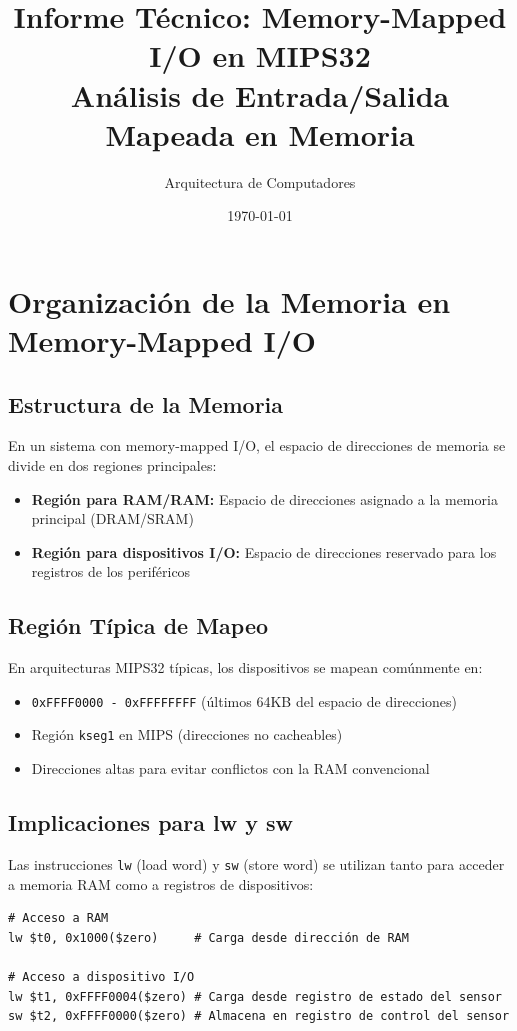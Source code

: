 \documentclass[12pt,a4paper]{article}
\title{\textbf{Informe Técnico: Memory-Mapped I/O en MIPS32} \\
\large Análisis de Entrada/Salida Mapeada en Memoria}
\author{Arquitectura de Computadores}
\date{\today}
\begin{document}
\maketitle
\tableofcontents
\newpage

\section{Organización de la Memoria en Memory-Mapped I/O}

\subsection{Estructura de la Memoria}
En un sistema con memory-mapped I/O, el espacio de direcciones de memoria se divide en dos regiones principales:

\begin{itemize}
    \item \textbf{Región para RAM/RAM:} Espacio de direcciones asignado a la memoria principal (DRAM/SRAM)
    \item \textbf{Región para dispositivos I/O:} Espacio de direcciones reservado para los registros de los periféricos
\end{itemize}

\subsection{Región Típica de Mapeo}
En arquitecturas MIPS32 típicas, los dispositivos se mapean comúnmente en:
\begin{itemize}
    \item \texttt{0xFFFF0000 - 0xFFFFFFFF} (últimos 64KB del espacio de direcciones)
    \item Región \texttt{kseg1} en MIPS (direcciones no cacheables)
    \item Direcciones altas para evitar conflictos con la RAM convencional
\end{itemize}

\subsection{Implicaciones para lw y sw}
Las instrucciones \texttt{lw} (load word) y \texttt{sw} (store word) se utilizan tanto para acceder a memoria RAM como a registros de dispositivos:

\begin{lstlisting}[style=mipsstyle]
# Acceso a RAM
lw $t0, 0x1000($zero)     # Carga desde dirección de RAM

# Acceso a dispositivo I/O  
lw $t1, 0xFFFF0004($zero) # Carga desde registro de estado del sensor
sw $t2, 0xFFFF0000($zero) # Almacena en registro de control del sensor
\end{lstlisting}
\end{document}
